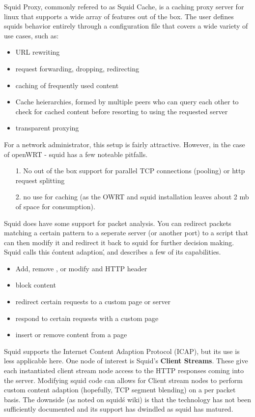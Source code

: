 \documentclass{article}
\begin{document}
Squid Proxy, commonly refered to as Squid Cache, is a caching proxy server for linux that supports a wide array of features out of the box. The user defines squids behavior entirely through a configuration file that covers a wide variety of use cases, such as:
\begin{itemize}
\item URL rewriting 
\item request forwarding, dropping, redirecting
\item caching of frequently used content
\item Cache heierarchies, formed by multiple peers who can query each other to check for cached content before resorting to using the requested server
\item transparent proxying
\end{itemize}

For a network administrator, this setup is fairly attractive. However, in the case of openWRT - squid has a few noteable pitfalls. 
\begin{itemize}
\item[1.] No out of the box support for parallel TCP connections (pooling) or http request splitting
\item[2.] no use for caching (as the OWRT and squid installation leaves about 2 mb of space for consumption).
\end{itemize}

Squid does have some support for packet analysis. You can redirect packets matching a certain pattern to a seperate server (or another port) to a script that can then modify it and redirect it back to squid for further decision making. Squid calls this \'content adaption\', and describes a few of its capabilities.
\begin{itemize}
\item Add, remove , or modify and HTTP header
\item block content
\item redirect certain requests to a custom page or server
\item respond to certain requests with a custom page
\item insert or remove content from a page
\end{itemize}

Squid supports the Internet Content Adaption Protocol (ICAP), but its use is less applicable here.
One node of interest is Squid's {\bf Client Streams}. These give each instantiated client stream node access to the HTTP responses coming into the server. Modifying squid code can allows for Client stream nodes to perform custom content adaption (hopefully, TCP segment blending) on a per packet basis. The downside (as noted on squid\'s wiki) is that the technology has not been sufficiently documented and its support has dwindled as squid has matured.
\end{document}
